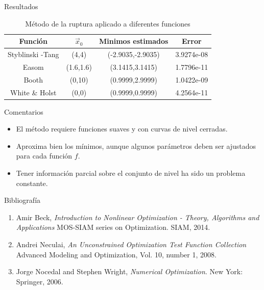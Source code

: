 \documentclass[fleqn]{beamer}
\begin{document}
\begin{frame}{Resultados}
\begin{table}[h]
    \centering
    \caption{Método de la ruptura aplicado a diferentes funciones}
    \begin{tabular}{|c|c|c|c|}\hline
    Función & $\vec{x}_0$ & Minimos estimados & Error \\
    \hline 
    Styblinski -Tang    & (4,4) &(-2.9035,-2.9035) & 3.9274e-08\\
    Easom  &  (1.6,1.6) &(3.1415,3.1415) & 1.7796e-11\\
    Booth  & (0,10) &(0.9999,2.9999) & 1.0422e-09\\
    White \& Holst     & (0,0) &(0.9999,0.9999) & 4.2564e-11\\
    \hline
    \end{tabular}
    \label{tab:Various}
\end{table}
\end{frame}


\begin{frame}{Comentarios}
    \begin{itemize}[<+->]
        \item El método requiere funciones suaves y con curvas de nivel cerradas.
        \item Aproxima bien los mínimos, aunque algunos parámetros deben ser ajustados para cada función $f$.
        \item Tener información parcial sobre el conjunto de nivel ha sido un problema constante.
    \end{itemize}
\end{frame}

\begin{frame}{Bibliografía}
\begin{enumerate}
    \item Amir Beck, \emph{Introduction to Nonlinear Optimization - Theory, Algorithms and Applications} MOS-SIAM series on Optimization. SIAM, 2014.\\
    \item Andrei Neculai, \emph{An Unconstrained Optimization Test Function Collection} Advanced Modeling and Optimization, Vol. 10, number 1, 2008.\\
    \item Jorge Nocedal and Stephen Wright,  \emph{Numerical Optimization}. New York: Springer, 2006.
\end{enumerate}
\end{frame}
\end{document}
